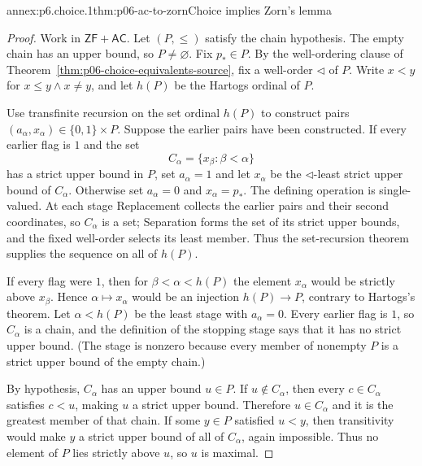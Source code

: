 \begin{annexitem}{annex:p6.choice.1}{thm:p06-ac-to-zorn}{Choice implies Zorn's lemma}
\begin{proof}
Work in \(\mathsf{ZF}+\mathsf{AC}\).  Let \((P,\leq)\) satisfy the chain
hypothesis.  The empty chain has an upper bound, so \(P\ne\varnothing\).
Fix \(p_*\in P\).  By the well-ordering clause of
Theorem~\ref{thm:p06-choice-equivalents-source}, fix a well-order
\(\triangleleft\) of \(P\).  Write \(x<y\) for
\(x\leq y\land x\ne y\), and let \(h(P)\) be the Hartogs ordinal of \(P\).

Use transfinite recursion on the set ordinal \(h(P)\) to construct pairs
\((a_\alpha,x_\alpha)\in\{0,1\}\times P\).  Suppose the earlier pairs have
been constructed.  If every earlier flag is \(1\) and the set
\[
  C_\alpha=\{x_\beta:\beta<\alpha\}
\]
has a strict upper bound in \(P\), set \(a_\alpha=1\) and let
\(x_\alpha\) be the \(\triangleleft\)-least strict upper bound of
\(C_\alpha\).  Otherwise set \(a_\alpha=0\) and
\(x_\alpha=p_*\).  The defining operation is single-valued.  At each stage
Replacement collects the earlier pairs and their second coordinates, so
\(C_\alpha\) is a set; Separation forms the set of its strict upper bounds,
and the fixed well-order selects its least member.  Thus the set-recursion
theorem supplies the sequence on all of \(h(P)\).

If every flag were \(1\), then for \(\beta<\alpha<h(P)\) the element
\(x_\alpha\) would be strictly above \(x_\beta\).  Hence
\(\alpha\mapsto x_\alpha\) would be an injection \(h(P)\to P\),
contrary to Hartogs's theorem.  Let \(\alpha<h(P)\) be the least stage with
\(a_\alpha=0\).  Every earlier flag is \(1\), so \(C_\alpha\) is a chain,
and the definition of the stopping stage says that it has no strict upper
bound.  (The stage is nonzero because every member of nonempty \(P\) is a
strict upper bound of the empty chain.)

By hypothesis, \(C_\alpha\) has an upper bound \(u\in P\).  If
\(u\notin C_\alpha\), then every \(c\in C_\alpha\) satisfies
\(c<u\), making \(u\) a strict upper bound.  Therefore
\(u\in C_\alpha\) and it is the greatest member of that chain.  If some
\(y\in P\) satisfied \(u<y\), then transitivity would make \(y\) a strict
upper bound of all of \(C_\alpha\), again impossible.  Thus no element of
\(P\) lies strictly above \(u\), so \(u\) is maximal.
\end{proof}
\end{annexitem}

